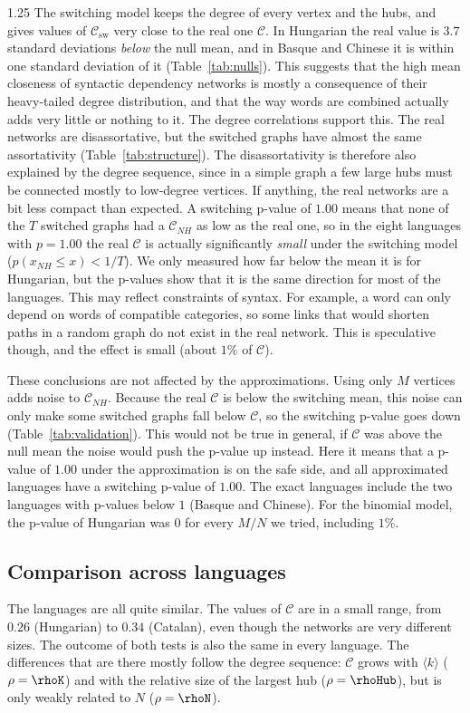 \documentclass[12pt]{article}
\newcommand{\metric}{\mathcal{C}}
\begin{document}
\begin{spacing}{1.25}
The switching model keeps the degree of every vertex and the hubs, and gives values of $\metric_{\mathrm{sw}}$ very close to the real one $\metric$. In Hungarian the real value is $3.7$ standard deviations \emph{below} the null mean, and in Basque and Chinese it is within one standard deviation of it (Table~\ref{tab:nulls}). This suggests that the high mean closeness of syntactic dependency networks is mostly a consequence of their heavy-tailed degree distribution, and that the way words are combined actually adds very little or nothing to it. The degree correlations support this. The real networks are disassortative, but the switched graphs have almost the same assortativity (Table~\ref{tab:structure}). The disassortativity is therefore also explained by the degree sequence, since in a simple graph a few large hubs must be connected mostly to low-degree vertices. If anything, the real networks are a bit less compact than expected. A switching p-value of $1.00$ means that none of the $T$ switched graphs had a $\metric_{NH}$ as low as the real one, so in the eight languages with $p=1.00$ the real $\metric$ is actually significantly \emph{small} under the switching model ($p(x_{NH} \leq x) < 1/T$). We only measured how far below the mean it is for Hungarian, but the p-values show that it is the same direction for most of the languages. This may reflect constraints of syntax. For example, a word can only depend on words of compatible categories, so some links that would shorten paths in a random graph do not exist in the real network. This is speculative though, and the effect is small (about $1\%$ of $\metric$).

These conclusions are not affected by the approximations. Using only $M$ vertices adds noise to $\metric_{NH}$. Because the real $\metric$ is below the switching mean, this noise can only make some switched graphs fall below $\metric$, so the switching p-value goes down (Table~\ref{tab:validation}). This would not be true in general, if $\metric$ was above the null mean the noise would push the p-value up instead. Here it means that a p-value of $1.00$ under the approximation is on the safe side, and all approximated languages have a switching p-value of $1.00$. The exact languages include the two languages with p-values below $1$ (Basque and Chinese). For the binomial model, the p-value of Hungarian was $0$ for every $M/N$ we tried, including $1\%$.

\subsection{Comparison across languages}
The languages are all quite similar. The values of $\metric$ are in a small range, from $0.26$ (Hungarian) to $0.34$ (Catalan), even though the networks are very different sizes. The outcome of both tests is also the same in every language. The differences that are there mostly follow the degree sequence: $\metric$ grows with $\langle k\rangle$ ($\rho=\rhoK$) and with the relative size of the largest hub ($\rho=\rhoHub$), but is only weakly related to $N$ ($\rho=\rhoN$).


\end{spacing}
\end{document}
